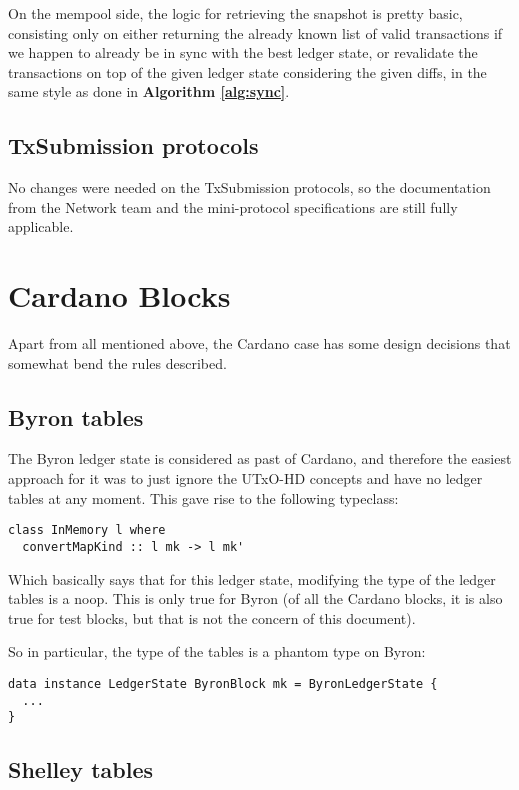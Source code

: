 \documentclass[11pt,a4paper]{article}
\theoremstyle{definition}
\begin{document}
On the mempool side, the logic for retrieving the snapshot is pretty basic,
consisting only on either returning the already known list of valid transactions
if we happen to already be in sync with the best ledger state, or revalidate the
transactions on top of the given ledger state considering the given diffs, in the same style as done in \textbf{Algorithm \ref{alg:sync}}.

\subsection{TxSubmission protocols}

No changes were needed on the TxSubmission protocols, so the documentation from
the Network team and the mini-protocol specifications are still fully
applicable.

\section{Cardano Blocks}

Apart from all mentioned above, the Cardano case has some design decisions that
somewhat bend the rules described.

\subsection{Byron tables}

The Byron ledger state is considered as past of Cardano, and therefore the
easiest approach for it was to just ignore the UTxO-HD concepts and have no
ledger tables at any moment. This gave rise to the following typeclass:

\begin{lstlisting}
class InMemory l where
  convertMapKind :: l mk -> l mk'
\end{lstlisting}
Which basically says that for this ledger state, modifying the type of the
ledger tables is a noop. This is only true for Byron (of all the Cardano blocks,
it is also true for test blocks, but that is not the concern of this document).

So in particular, the type of the tables is a phantom type on Byron:

\begin{lstlisting}
data instance LedgerState ByronBlock mk = ByronLedgerState {
  ...
}
\end{lstlisting}

\subsection{Shelley tables}
\end{document}
